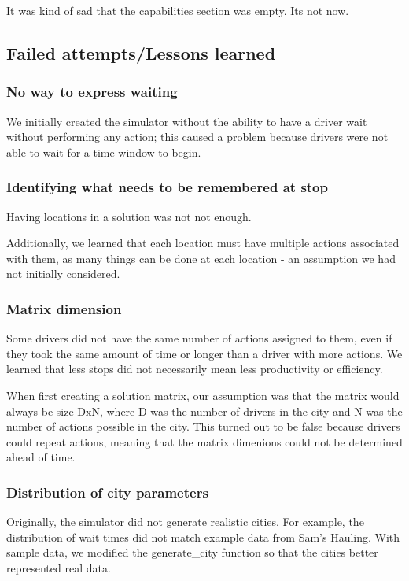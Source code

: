 \documentclass{article}
\begin{document}
It was kind of sad that the capabilities section was empty.
Its not now.


\subsection{Failed attempts/Lessons learned}


\subsubsection{No way to express waiting}
We initially created the simulator without the ability to have a driver wait without performing any action;
this caused a problem because drivers were not able to wait for a time window to begin.  


\subsubsection{Identifying what needs to be remembered at stop}
Having locations in a solution was not not enough.

Additionally, we learned that each location must have multiple actions associated with them, 
as many things can be done at each location - an assumption we had not initially considered.


\subsubsection{Matrix dimension}
Some drivers did not have the same number of actions assigned to them, even if they took the same amount of time or longer than a driver with more actions.
We learned that less stops did not necessarily mean less productivity or efficiency.

When first creating a solution matrix, our assumption was that the matrix would always be size DxN, where D was the number of drivers in the city and N was the number of actions possible in the city. 
This turned out to be false because drivers could repeat actions, meaning that the matrix dimenions could not be determined ahead of time.

\subsubsection{Distribution of city parameters}
Originally, the simulator did not generate realistic cities.
For example, the distribution of wait times did not match example data from Sam's Hauling.
With sample data, we modified the generate\_city function so that the cities better represented real data.
\end{document}
